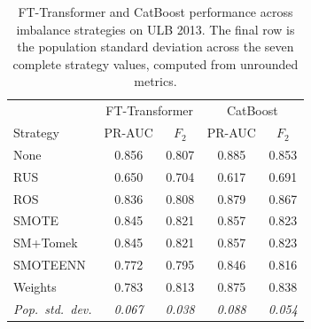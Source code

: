 \begin{table}[H]
\centering
\caption{FT-Transformer and CatBoost performance across imbalance strategies on ULB 2013. The final row is the population standard deviation across the seven complete strategy values, computed from unrounded metrics.}
\label{tab:transformer_robustness_ulb}
\begin{tabular}{l cc cc}
\toprule
& \multicolumn{2}{c}{FT-Transformer} & \multicolumn{2}{c}{CatBoost} \\
Strategy & PR-AUC & $F_2$ & PR-AUC & $F_2$ \\
\midrule
None      & 0.856 & 0.807 & 0.885 & 0.853 \\
RUS       & 0.650 & 0.704 & 0.617 & 0.691 \\
ROS       & 0.836 & 0.808 & 0.879 & 0.867 \\
SMOTE     & 0.845 & 0.821 & 0.857 & 0.823 \\
SM+Tomek  & 0.845 & 0.821 & 0.857 & 0.823 \\
SMOTEENN  & 0.772 & 0.795 & 0.846 & 0.816 \\
Weights   & 0.783 & 0.813 & 0.875 & 0.838 \\
\midrule
\textit{Pop.\ std.\ dev.} & \textit{0.067} & \textit{0.038} & \textit{0.088} & \textit{0.054} \\
\bottomrule
\end{tabular}
\end{table}